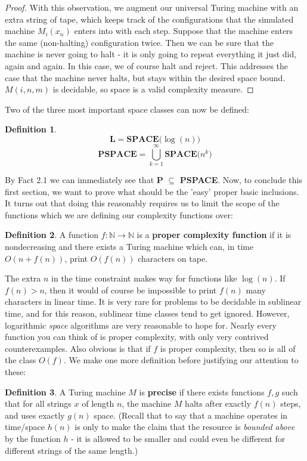 \documentclass{article}
\theoremstyle{definition}
\newtheorem{definition}{Definition}[section]
\theoremstyle{plain}
\theoremstyle{theorem}
\begin{document}
\begin{proof}
	\par With this observation, we augment our universal Turing machine with an extra string of tape, which keeps track of the configurations that the simulated machine $M_i(x_n)$ enters into with each step. Suppose that the machine enters the same (non-halting) configuration twice. Then we can be sure that the machine is never going to halt - it is only going to repeat everything it just did, again and again. In this case, we of course halt and reject. This addresses the case that the machine never halts, but stays within the desired space bound. $M(i,n,m)$ is decidable, so space is a valid complexity measure.
\end{proof}
Two of the three most important space classes can now be defined:
\begin{definition}
\[ \textbf{L} = \textbf{SPACE($\log(n)$)} \]
\[ \textbf{PSPACE} = \bigcup_{k=1}^\infty \textbf{SPACE($n^k$)} \]
\end{definition}
By Fact 2.1 we can immediately see that \textbf{P} $\subseteq$ \textbf{PSPACE}.
Now, to conclude this first section, we want to prove what should be the 'easy' proper basic inclusions. It turns out that doing this reasonably requires us to limit the scope of the functions which we are defining our complexity functions over:
\begin{definition}
	A function $f:\mathbb{N} \to \mathbb{N}$ is a \textbf{proper complexity function} if it is nondecreasing and there exists a Turing machine which can, in time $O(n+f(n))$, print $O(f(n))$ characters on tape. 
\end{definition}
The extra $n$ in the time constraint makes way for functions like $\log(n)$. If $f(n) > n$, then it would of course be impossible to print $f(n)$ many characters in linear time. It is very rare for problems to be decidable in sublinear time, and for this reason, sublinear time classes tend to get ignored. However, logarithmic \textit{space} algorithms are very reasonable to hope for. Nearly every function you can think of is proper complexity, with only very contrived counterexamples. Also obvious is that if $f$ is proper complexity, then so is all of the class $O(f)$. We make one more definition before justifying our attention to these:
\begin{definition}
	A Turing machine $M$ is \textbf{precise} if there exists functions $f,g$ such that for all strings $x$ of length $n$, the machine $M$ halts after exactly $f(n)$ steps, and uses exactly $g(n)$ space. (Recall that to say that a machine operates in time/space $h(n)$ is only to make the claim that the resource is \textit{bounded above} by the function $h$ - it is allowed to be smaller and could even be different for different strings of the same length.)
\end{definition} 
\end{document}
